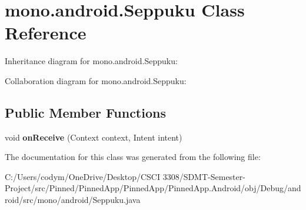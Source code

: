 \hypertarget{classmono_1_1android_1_1_seppuku}{}\section{mono.\+android.\+Seppuku Class Reference}
\label{classmono_1_1android_1_1_seppuku}


Inheritance diagram for mono.\+android.\+Seppuku\+:


Collaboration diagram for mono.\+android.\+Seppuku\+:
\subsection*{Public Member Functions}
\begin{DoxyCompactItemize}
\item 
\mbox{\label{classmono_1_1android_1_1_seppuku_abf493c6888eae9735c6b1fd052c25a2a}} 
void {\bfseries on\+Receive} (Context context, Intent intent)
\end{DoxyCompactItemize}


The documentation for this class was generated from the following file\+:\begin{DoxyCompactItemize}
\item 
C\+:/\+Users/codym/\+One\+Drive/\+Desktop/\+C\+S\+C\+I 3308/\+S\+D\+M\+T-\/\+Semester-\/\+Project/src/\+Pinned/\+Pinned\+App/\+Pinned\+App/\+Pinned\+App.\+Android/obj/\+Debug/android/src/mono/android/Seppuku.\+java\end{DoxyCompactItemize}
